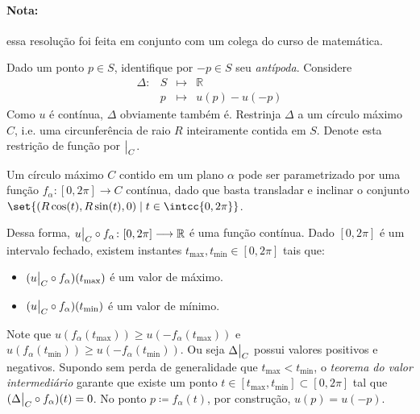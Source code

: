 \documentclass{IMTexam}
\newcommand\restrict[1]{{%
		\left.\kern-\nulldelimiterspace %
		\vphantom{\big|} %
		\right|_{#1} %
}}
\begin{document}
\begin{questions}
		\begin{solution}
			\paragraph{Nota:} essa resolução foi feita em conjunto com um colega do curso de matemática.
			
			Dado um ponto $p \in S$, identifique por $-p \in S$ seu \textit{antípoda}. Considere
			\begin{equation*}
				\begin{array}{lccc}
					\Delta : & S & \longmapsto & \mathbb{R}\\
					& p & \longmapsto & u(p)-u(-p)
				\end{array}
			\end{equation*}
			Como $u$ é contínua, $\Delta$ obviamente também é. Restrinja $\Delta$ a um círculo máximo $C$, i.e. uma circunferência de raio $R$ inteiramente contida em $S$. Denote esta restrição de função por $\restrict{C}$. 
			
			Um círculo máximo $C$ contido em um plano $\alpha$ pode ser parametrizado por uma função $f_{\alpha} : [0,2\pi] \longrightarrow C$ contínua, dado que basta transladar e inclinar o conjunto $\set{(R\cos(t),R\sin(t), 0) \mid t\in \intcc{0,2\pi}}$.
			
			Dessa forma, $ u\restrict{C} \circ f_{\alpha} \colon [0,2\pi] \longrightarrow \mathbb{R}$ é uma função contínua. Dado $[0,2\pi]$ é um intervalo fechado, existem instantes  $t_{\text{max}},t_{\text{min}}\in [0,2\pi]$ tais que:
			\begin{itemize}[label=\textbullet]
				\item $(u \restrict{C} \circ f_{\alpha})(t_{\text{max}})$ é um valor de máximo.
				\item $(u \restrict{C} \circ f_{\alpha})(t_{\text{min}})$ é um valor de mínimo.
			\end{itemize}
			Note que $u(f_\alpha(t_{\text{max}}))\geqslant u(-f_\alpha(t_{\text{max}}))$ e $u(f_\alpha(t_{\text{min}}))\geqslant u(-f_\alpha(t_{\text{min}}))$. Ou seja $\Delta\restrict{C}$ possui valores positivos e negativos. Supondo sem perda de generalidade que $t_{\text{max}} < t_{\text{min}}$, o \textit{teorema do valor intermediário} garante que existe um ponto $t\in [t_{\text{max}},t_{\text{min}}]\subset [0,2\pi]$ tal que $(\Delta \restrict{C} \circ f_{\alpha})(t) = 0$. No ponto $p\coloneqq  f_{\alpha}(t)$,  por construção, $u(p)=u(-p)$. 
			

\end{solution}
\end{questions}
\end{document}
